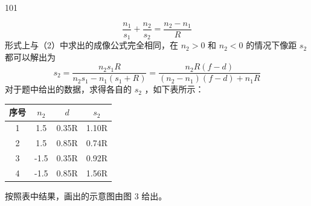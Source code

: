 \begin{solution}{101}
\begin{subsolution}
\begin{equation}
            \frac {n _ {1}}{s _ {1}} + \frac {n _ {2}}{s _ {2}} = \frac {n _ {2} - n _ {1}}{R}
            \label{eq:15.p101}
        \end{equation}
        形式上与（2）中求出的成像公式完全相同，在 $n_2 > 0$ 和 $n_2 < 0$ 的情况下像距 $s_2$ 都可以解出为
        \begin{equation}
            s _ {2} = \frac {n _ {2} s _ {1} R}{n _ {2} s _ {1} - n _ {1} (s _ {1} + R)} = \frac {n _ {2} R (f - d)}{(n _ {2} - n _ {1}) (f - d) + n _ {1} R}
            \label{eq:16.p101}
        \end{equation}
        对于题中给出的数据，求得各自的 $s_2$ ，如下表所示：

        \begin{tabular}{|c|c|c|c|}
            \hline
            序号 & $n_2$ & $d$ & $s_2$ \\
            \hline
            1 & 1.5 & 0.35R & 1.10R \\
            \hline
            2 & 1.5 & 0.85R & 0.74R \\
            \hline
            3 & -1.5 & 0.35R & 0.92R \\
            \hline
            4 & -1.5 & 0.85R & 1.56R \\
            \hline
        \end{tabular}

        按照表中结果，画出的示意图由图 3 给出。
    \end{subsolution}
\end{solution}